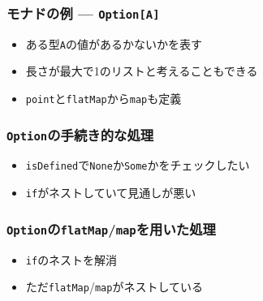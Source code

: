 \begin{frame}
  \frametitle{モナドの例 --- \protect\lstinline|Option[A]|}

  \begin{itemize}
    \item<2-> ある型\lstinline|A|の値があるかないかを表す
    \item<3-> 長さが最大で1のリストと考えることもできる
  \end{itemize}


  \begin{itemize}
    \item<5-> \lstinline|point|と\lstinline|flatMap|から\lstinline|map|も定義
  \end{itemize}
\end{frame}

\begin{frame}
  \begin{center}

  \end{center}
\end{frame}

\begin{frame}
  \frametitle{\protect\lstinline|Option|の手続き的な処理}


  \begin{itemize}
    \item<3-> \lstinline|isDefined|で\lstinline|None|か\lstinline|Some|かをチェックしたい
    \item<4-> \lstinline|if|がネストしていて見通しが悪い
  \end{itemize}
\end{frame}

\begin{frame}
  \frametitle{\protect\lstinline|Option|の\protect\lstinline|flatMap|/\lstinline|map|を用いた処理}


  \begin{itemize}
    \item<3-> \lstinline|if|のネストを解消
    \item<4-> ただ\lstinline|flatMap|/\lstinline|map|がネストしている
  \end{itemize}
\end{frame}

